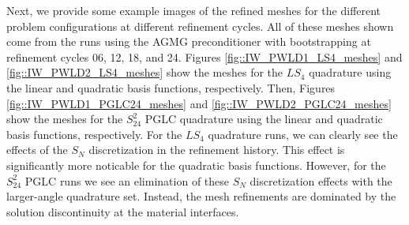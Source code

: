 Next, we provide some example images of the refined meshes for the different problem configurations at different refinement cycles. All of these meshes shown come from the runs using the AGMG preconditioner with bootstrapping at refinement cycles 06, 12, 18, and 24. Figures \ref{fig::IW_PWLD1_LS4_meshes} and \ref{fig::IW_PWLD2_LS4_meshes} show the meshes for the $LS_4$ quadrature using the linear and quadratic basis functions, respectively. Then, Figures \ref{fig::IW_PWLD1_PGLC24_meshes} and \ref{fig::IW_PWLD2_PGLC24_meshes} show the meshes for the $S_{24}^2$ PGLC quadrature using the linear and quadratic basis functions, respectively. For the $LS_4$ quadrature runs, we can clearly see the effects of the $S_N$ discretization in the refinement history. This effect is significantly more noticable for the quadratic basis functions. However, for the $S_{24}^2$ PGLC runs we see an elimination of these $S_N$ discretization effects with the larger-angle quadrature set. Instead, the mesh refinements are dominated by the solution discontinuity at the material interfaces.

